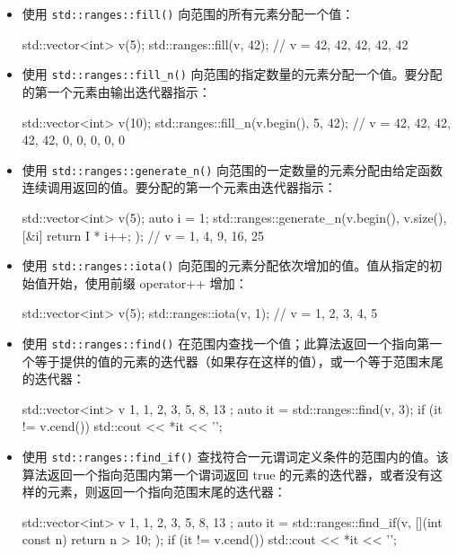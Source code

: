 \begin{itemize}
\item
使用 \verb|std::ranges::fill()| 向范围的所有元素分配一个值：

\begin{cpp}
std::vector<int> v(5);
std::ranges::fill(v, 42);
// v = {42, 42, 42, 42, 42}
\end{cpp}

\item
使用 \verb|std::ranges::fill_n()| 向范围的指定数量的元素分配一个值。要分配的第一个元素由输出迭代器指示：

\begin{cpp}
std::vector<int> v(10);
std::ranges::fill_n(v.begin(), 5, 42);
// v = {42, 42, 42, 42, 42, 0, 0, 0, 0, 0}
\end{cpp}

\item
使用 \verb|std::ranges::generate_n()| 向范围的一定数量的元素分配由给定函数连续调用返回的值。要分配的第一个元素由迭代器指示：

\begin{cpp}
std::vector<int> v(5);
auto i = 1;
std::ranges::generate_n(v.begin(), v.size(),
                        [&i] { return I * i++; });
// v = {1, 4, 9, 16, 25}
\end{cpp}

\item
使用 \verb|std::ranges::iota()| 向范围的元素分配依次增加的值。值从指定的初始值开始，使用前缀 operator++ 增加：

\begin{cpp}
std::vector<int> v(5);
std::ranges::iota(v, 1);
// v = {1, 2, 3, 4, 5}
\end{cpp}

\item
使用 \verb|std::ranges::find()| 在范围内查找一个值；此算法返回一个指向第一个等于提供的值的元素的迭代器（如果存在这样的值），或一个等于范围末尾的迭代器：

\begin{cpp}
std::vector<int> v{ 1, 1, 2, 3, 5, 8, 13 };
auto it = std::ranges::find(v, 3);
if (it != v.cend()) std::cout << *it << '\n';
\end{cpp}

\item
使用 \verb|std::ranges::find_if()| 查找符合一元谓词定义条件的范围内的值。该算法返回一个指向范围内第一个谓词返回 true 的元素的迭代器，或者没有这样的元素，则返回一个指向范围末尾的迭代器：

\begin{cpp}
std::vector<int> v{ 1, 1, 2, 3, 5, 8, 13 };
auto it = std::ranges::find_if(v, [](int const n) { return n > 10; });
if (it != v.cend()) std::cout << *it << '\n';
\end{cpp}


\end{itemize}
